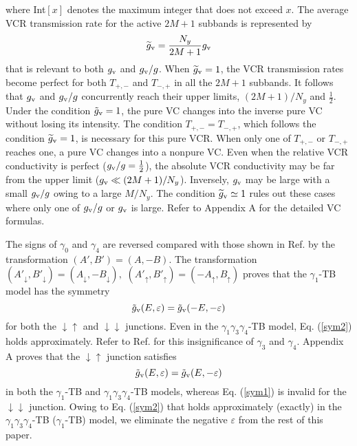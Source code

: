 \documentclass{jpsj3}
\begin{document}
where Int$[x]$ denotes the maximum integer that does not exceed $x$. 
The average VCR transmission rate
for the active $2M+1$ subbands is represented by
\begin{equation}
\widetilde{g}_{\rm v} =\frac{N_y}{2M+1} g_{\rm v}
\label{ave-gv}
\end{equation}
that is relevant to both $g_{\rm v}$ and $g_{\rm v}/g$.
When $\widetilde{g}_{\rm v}=1$,
the VCR transmission rates become perfect 
for both $T_{+,-}$ and $T_{-,+}$ in all the $2M+1$ subbands.
It follows that $g_{\rm v}$ and $g_{\rm v}/g$ 
concurrently reach their upper limits, $(2M+1)/N_y$
and $\frac{1}{2}$.
Under the condition $\tilde{g}_{\rm v}=1$,
the pure VC changes into the inverse pure VC without losing
its intensity. The condition $T_{+,-}=T_{-,+}$,  which follows 
the condition $\widetilde{g}_{\rm v}=1$, is 
necessary for this pure VCR.
When only one of $T_{+,-}$ or $T_{-,+}$ reaches one, a pure VC changes
into a nonpure VC.
Even when the relative VCR conductivity is perfect ($g_{\rm v}/g=\frac{1}{2}$),
the absolute VCR conductivity may be far from the upper limit
($ g_{\rm v} \ll (2M+1)/N_y$).
Inversely,
$g_{\rm v}$ may be large with a small $g_{\rm v}/g$ owing to a large $M/N_y$.
The condition $\widetilde{g}_{\rm v} \simeq 1$ rules out
these cases where only one of $g_{\rm v}/g$ or $g_{\rm v}$ is large.
Refer to Appendix A for the detailed VC formulas.

The signs of $\gamma_0$ and
$\gamma_{4}$ are reversed compared with those shown in Ref. \cite{TB-parameter} by the transformation $(A',B')=(A,-B)$. 
The transformation $
(A'_{\downarrow},B'_\downarrow)=(A_{\downarrow},-B_\downarrow), $ $(A'_{\uparrow},B'_\uparrow)=(-A_{\uparrow},B_\uparrow)$ proves that
the $\gamma_1$-TB model
has the symmetry
\begin{equation}
\tilde{g}_{\rm v}(E,\varepsilon)=\tilde{g}_{\rm v}(-E,-\varepsilon)
\label{sym2}
\end{equation}
for both the $\downarrow\uparrow$ and $\downarrow\downarrow$ 
junctions.
Even in the $\gamma_1\gamma_3\gamma_4$-TB model, Eq. (\ref{sym2})
holds approximately. Refer to Ref. \cite{tamura-2019} for  this insignificance of $\gamma_3$ and $\gamma_4$.
Appendix A proves that the $\downarrow\uparrow$
junction satisfies
\begin{equation}
\tilde{g}_{\rm v}(E,\varepsilon)=\tilde{g}_{\rm v}(E,-\varepsilon)
\label{sym1}
\end{equation}
in both the $\gamma_1$-TB and $\gamma_1\gamma_3\gamma_4$-TB models,
whereas Eq. (\ref{sym1}) is invalid for the $\downarrow\downarrow$ junction.
Owing to Eq. (\ref{sym2}) that holds approximately (exactly) in the $\gamma_1\gamma_3\gamma_4$-TB ($\gamma_1$-TB) model, 
we eliminate the negative $\varepsilon$ from the rest of this paper.
\end{document}
